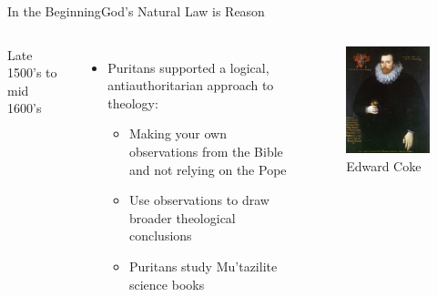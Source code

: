 \begin{frame}{In the Beginning}{God's Natural Law is Reason}
	\begin{columns}[T]
			Late 1500's to mid 1600's
			\begin{itemize}
				\item Puritans supported a logical, antiauthoritarian approach to theology:
					\begin{itemize}
						\item Making your own observations from the Bible and not relying on the Pope
						\item Use observations to draw broader theological conclusions
						\item Puritans study Mu'tazilite science books
					\end{itemize}
			\end{itemize}
			\begin{figure}
				\centering
				\includegraphics[width=\textwidth]{images/edward_coke.png}
				\caption{Edward Coke}
			\end{figure}
	\end{columns}
\end{frame}



